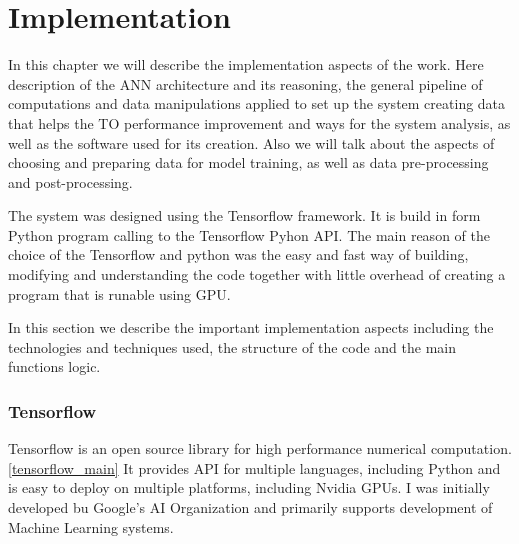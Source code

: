 
\chapter{Implementation}

In this chapter we will describe the implementation aspects of the work.
Here description of the ANN architecture and its reasoning, the general pipeline of computations and data manipulations applied to set up the system creating data that helps the TO performance improvement and ways for the system analysis, as well as the software used for its creation.
Also we will talk about the aspects of choosing and preparing data for model training, as well as data pre-processing and post-processing.



The system was designed using the Tensorflow framework. 
It is build in form Python program calling to the Tensorflow Pyhon API.
The main reason of the choice of the Tensorflow and python was the easy and fast way of building, modifying and understanding the code together with little overhead of
creating a program that is runable using GPU. 

In this section we describe the important implementation aspects including the technologies and techniques used, the structure of the code and the main functions logic.

\subsection{Tensorflow}

Tensorflow is an open source library for high performance numerical computation.\ref{tensorflow_main} 
It provides API for multiple languages, including Python and is easy to deploy on multiple platforms, including Nvidia GPUs.
I was initially developed bu Google's AI Organization and primarily supports development of Machine Learning systems.

